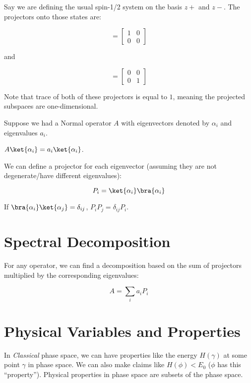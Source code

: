 \documentclass[a4paper,twoside,master.tex]{subfiles}
\begin{document}
Say we are defining the usual spin-1/2 system on the basis $z+$ and
$z-$. The projectors onto those states are:

\begin{equation}
[z+] = \begin{bmatrix}1&0\\0&0\end{bmatrix}
\end{equation}

and

\begin{equation}
[z-] = \begin{bmatrix}0&0\\0&1\end{bmatrix}
\end{equation}

Note that trace of both of these projectors is equal to $1$, meaning
the projected subspaces are one-dimensional.

Suppose we had a Normal operator $A$ with eigenvectors denoted by
$\alpha_i$ and eigenvalues $a_i$.

$A\ket{\alpha_i} = a_i\ket{\alpha_i}$.

We can define a projector for each eigenvector (assuming they are not
degenerate/have different eigenvalues):

\begin{equation}
P_i = \ket{\alpha_i}\bra{\alpha_i}
\end{equation}

If $\bra{\alpha_i}\ket{\alpha_j} = \delta_{ij}$,
$P_iP_j = \delta_{ij}P_i$.

\section{Spectral Decomposition}
\label{sec:spectral_decomposition}

For any operator, we can find a decomposition based on the sum of
projectors multiplied by the corresponding eigenvalues:

\begin{equation}
A = \sum_i a_iP_i
\end{equation}

\section{Physical Variables and Properties}
\label{sec:physical_variables_and_properties}

In \emph{Classical} phase space, we can have properties like the energy
$H(\gamma)$ at some point $\gamma$ in phase space. We can also make
claims like $H(\phi) < E_0$ ($\phi$ has this ``property''). Physical
properties in phase space are subsets of the phase space.
\end{document}
